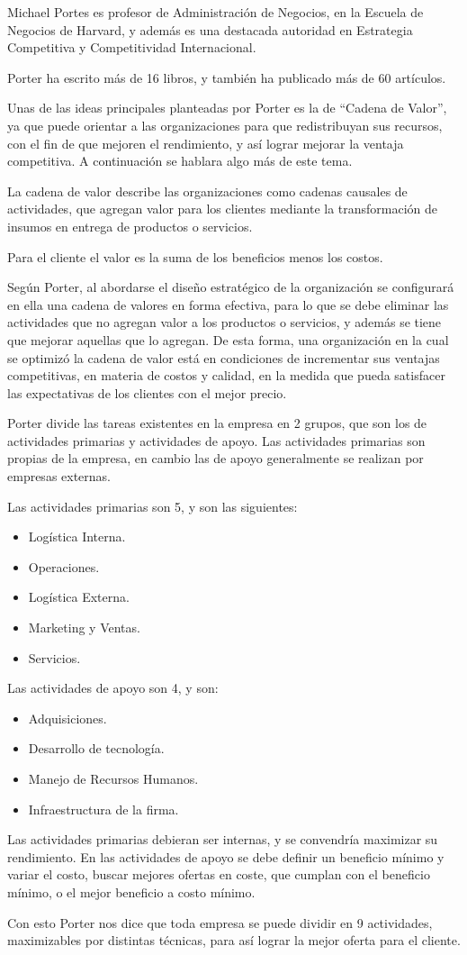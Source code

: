Michael Portes es profesor de Administración de Negocios, en la Escuela de Negocios de Harvard,
y además es una destacada autoridad en Estrategia Competitiva y Competitividad Internacional.

Porter ha escrito más de 16 libros, y también ha publicado más de 60 artículos.

Unas de las ideas principales planteadas por Porter es la de “Cadena de Valor”, ya que puede
orientar a las organizaciones para que redistribuyan sus recursos, con el fin de que mejoren el
rendimiento, y así lograr mejorar la ventaja competitiva. A continuación se hablara algo más de
este tema.

La cadena de valor describe las organizaciones como cadenas causales de actividades, que agregan
valor para los clientes mediante la transformación de insumos en entrega de productos o servicios.

Para el cliente el valor es la suma de los beneficios menos los costos.

Según Porter, al abordarse el diseño estratégico de la organización se configurará en ella una
cadena de valores en forma efectiva, para lo que se debe eliminar las actividades que no agregan
valor a los productos o servicios, y además se tiene que mejorar aquellas que lo agregan. De esta
forma, una organización en la cual se optimizó la cadena de valor está en condiciones de incrementar
sus ventajas competitivas, en materia de costos y calidad, en la medida que pueda satisfacer las
expectativas de los clientes con el mejor precio.

Porter divide las tareas existentes en la empresa en 2 grupos, que son los de actividades primarias
y actividades de apoyo. Las actividades primarias son propias de la empresa, en cambio las de apoyo
generalmente se realizan por empresas externas.

Las actividades primarias son 5, y son las siguientes:
\begin{itemize}
	\item Logística Interna.
	\item Operaciones.
	\item Logística Externa.
	\item Marketing y Ventas.
	\item Servicios.
\end{itemize}
Las actividades de apoyo son 4, y son:
\begin{itemize}
	\item Adquisiciones.
	\item Desarrollo de tecnología.
	\item Manejo de Recursos Humanos.
	\item Infraestructura de la firma.
\end{itemize}
Las actividades primarias debieran ser internas, y se convendría maximizar su rendimiento. En las
actividades de apoyo se debe definir un beneficio mínimo y variar el costo, buscar mejores ofertas en
coste, que cumplan con el beneficio mínimo, o el mejor beneficio a costo mínimo.

Con esto Porter nos dice que toda empresa se puede dividir en 9 actividades, maximizables por distintas
técnicas, para así lograr la mejor oferta para el cliente.

\newpage

